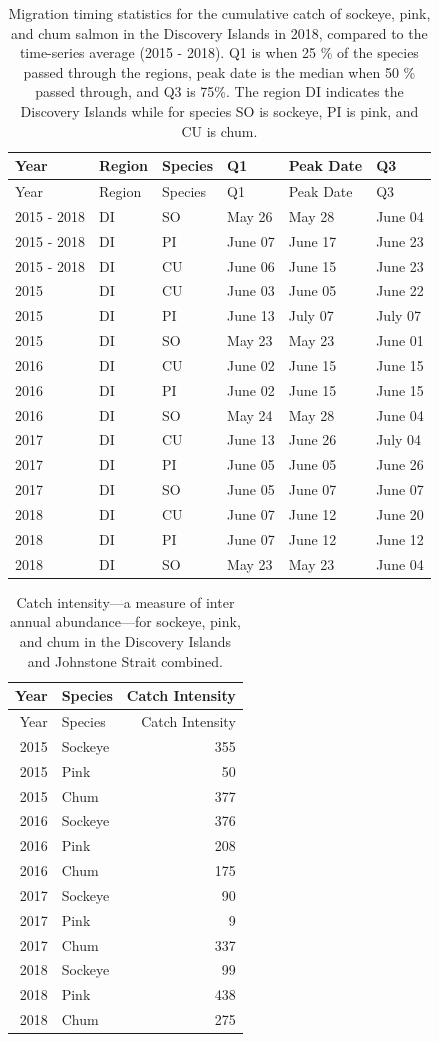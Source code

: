 \documentclass[fleqn,10pt]{wlpeerj} %
\begin{document}
\begin{longtable}[]{@{}llllll@{}}
\caption{\label{tab:mtdi} Migration timing statistics for the cumulative
catch of sockeye, pink, and chum salmon in the Discovery Islands in
2018, compared to the time-series average (2015 - 2018). Q1 is when 25
\% of the species passed through the regions, peak date is the median
when 50 \% passed through, and Q3 is 75\%. The region DI indicates the
Discovery Islands while for species SO is sockeye, PI is pink, and CU is
chum.}\tabularnewline
\toprule
Year & Region & Species & Q1 & Peak Date & Q3\tabularnewline
\midrule
\endfirsthead
\toprule
Year & Region & Species & Q1 & Peak Date & Q3\tabularnewline
\midrule
\endhead
2015 - 2018 & DI & SO & May 26 & May 28 & June 04\tabularnewline
2015 - 2018 & DI & PI & June 07 & June 17 & June 23\tabularnewline
2015 - 2018 & DI & CU & June 06 & June 15 & June 23\tabularnewline
2015 & DI & CU & June 03 & June 05 & June 22\tabularnewline
2015 & DI & PI & June 13 & July 07 & July 07\tabularnewline
2015 & DI & SO & May 23 & May 23 & June 01\tabularnewline
2016 & DI & CU & June 02 & June 15 & June 15\tabularnewline
2016 & DI & PI & June 02 & June 15 & June 15\tabularnewline
2016 & DI & SO & May 24 & May 28 & June 04\tabularnewline
2017 & DI & CU & June 13 & June 26 & July 04\tabularnewline
2017 & DI & PI & June 05 & June 05 & June 26\tabularnewline
2017 & DI & SO & June 05 & June 07 & June 07\tabularnewline
2018 & DI & CU & June 07 & June 12 & June 20\tabularnewline
2018 & DI & PI & June 07 & June 12 & June 12\tabularnewline
2018 & DI & SO & May 23 & May 23 & June 04\tabularnewline
\bottomrule
\end{longtable}

\begin{longtable}[]{@{}rlr@{}}
\caption{\label{tab:catch-intensity} Catch intensity---a measure of inter
annual abundance---for sockeye, pink, and chum in the Discovery Islands
and Johnstone Strait combined.}\tabularnewline
\toprule
Year & Species & Catch Intensity\tabularnewline
\midrule
\endfirsthead
\toprule
Year & Species & Catch Intensity\tabularnewline
\midrule
\endhead
2015 & Sockeye & 355\tabularnewline
2015 & Pink & 50\tabularnewline
2015 & Chum & 377\tabularnewline
2016 & Sockeye & 376\tabularnewline
2016 & Pink & 208\tabularnewline
2016 & Chum & 175\tabularnewline
2017 & Sockeye & 90\tabularnewline
2017 & Pink & 9\tabularnewline
2017 & Chum & 337\tabularnewline
2018 & Sockeye & 99\tabularnewline
2018 & Pink & 438\tabularnewline
2018 & Chum & 275\tabularnewline
\bottomrule
\end{longtable}
\end{document}
